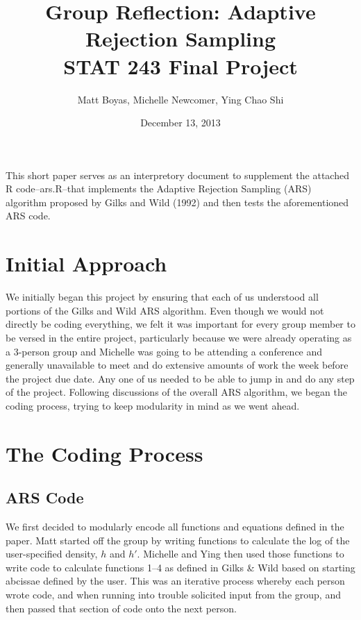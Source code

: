 \documentclass{article}
\begin{document}
\lstset{language=R, basicstyle=\ttfamily, columns=flexible, breaklines=TRUE}
    
\title{Group Reflection: Adaptive Rejection Sampling\\STAT 243 Final Project}
\author{Matt Boyas, Michelle Newcomer, Ying Chao Shi}

\date{December 13, 2013}
\maketitle
This short paper serves as an interpretory document to supplement the attached R code--ars.R--that implements the Adaptive Rejection Sampling (ARS) algorithm proposed by Gilks and Wild (1992) and then tests the aforementioned ARS code.
\section{Initial Approach}
We initially began this project by ensuring that each of us understood all portions of the Gilks and Wild ARS algorithm.  Even though we would not directly be coding everything, we felt it was important for every group member to be versed in the entire project, particularly because we were already operating as a 3-person group and Michelle was going to be attending a conference and generally unavailable to meet and do extensive amounts of work the week before the project due date.  Any one of us needed to be able to jump in and do any step of the project.  Following discussions of the overall ARS algorithm, we began the coding process, trying to keep modularity in mind as we went ahead. 
 
\section{The Coding Process}
\subsection{ARS Code}
We first decided to modularly encode all functions and equations defined in the paper.  Matt started off the group by writing functions to calculate the log of the user-specified density, $h$ and $h'$.  Michelle and Ying then used those functions to write code to calculate functions 1--4 as defined in Gilks \& Wild based on starting abcissae defined by the user. This was an iterative process whereby each person wrote code, and when running into trouble solicited input from the group, and then passed that section of code onto the next person. 
\end{document}
